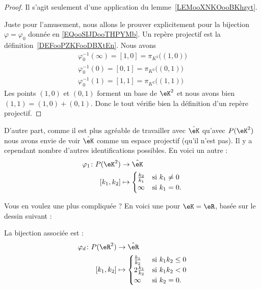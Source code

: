 \begin{proof}
    Il s'agit seulement d'une application du lemme~\ref{LEMooXNKOooBKhzyt}.

    Juste pour l'amusement, nous allons le prouver explicitement pour la bijection \( \varphi=\varphi_0\) donnée en \eqref{EQooSIJDooTHPYMb}. Un repère projectif est la définition~\ref{DEFooPZKFooDBXtEn}. Nous avons
    \begin{subequations}
        \begin{align}
            \varphi_0^{-1}(\infty)=[1,0]=\pi_{K^2}\big( (1,0) \big)\\
            \varphi_0^{-1}(0)=[0,1]=\pi_{K^2}\big( (0,1) \big)\\
            \varphi_0^{-1}(1)=[1,1]=\pi_{K^2}\big( (1,1) \big)
        \end{align}
    \end{subequations}
    Les points \( (1,0)\) et \( (0,1)\) forment un base de \( \eK^2\) et nous avons bien \( (1,1)=(1,0)+(0,1)\). Donc le tout vérifie bien la définition d'un repère projectif.
\end{proof}

    D'autre part, comme il est plus agréable de travailler avec \( \hat\eK\) qu'avec \( P(\eK^2)\) nous avons envie de voir \( \hat\eK\) comme un espace projectif (qu'il n'est pas). Il y a cependant nombre d'autres identifications possibles. En voici un autre :
\begin{equation}
    \begin{aligned}
        \varphi_1\colon P(\eK^2)&\to \hat\eK \\
        [k_1,k_2]&\mapsto \begin{cases}
            \frac{ k_2 }{ k_1 }    &   \text{si  } k_1\neq 0\\
            \infty    &    \text{si } k_1=0.
        \end{cases}
    \end{aligned}
\end{equation}

Vous en voulez une plus compliquée ? En voici une pour \( \eK=\eR\), basée sur le dessin suivant :
\begin{center}
   
\end{center}

La bijection associée est :
\begin{equation}        \label{EQooMIGCooAtXPaS}
    \begin{aligned}
        \varphi_d\colon P(\eR^2)&\to \hat\eR \\
        [k_1,k_2]&\mapsto \begin{cases}
            \frac{ k_1 }{ k_2 }    &   \text{si } k_1k_2\leq 0\\
            2\frac{ k_1 }{ k_2 }    &    \text{si } k_1k_2<0\\
             \infty  &    \text{si } k_2=0.
        \end{cases}
    \end{aligned}
\end{equation}

